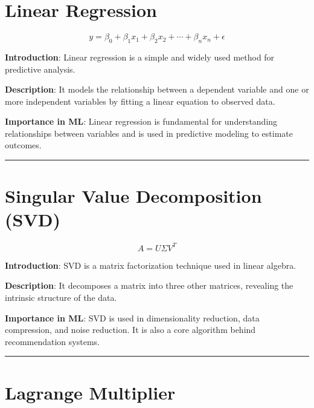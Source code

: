 \documentclass[
  12 pt,
  a4paper,
]{book}
\numberwithin{equation}{section}
\theoremstyle{plain}      %
\theoremstyle{definition} %
\theoremstyle{remark}     %
\theoremstyle{note}         %
\begin{document}
\hypertarget{linear-regression}{%
\chapter{Linear Regression}\label{linear-regression}}

\[
y = \beta_0 + \beta_1 x_1 + \beta_2 x_2 + \cdots + \beta_n x_n + \epsilon
\]

\textbf{Introduction}: Linear regression is a simple and widely used
method for predictive analysis.

\textbf{Description}: It models the relationship between a dependent
variable and one or more independent variables by fitting a linear
equation to observed data.

\textbf{Importance in ML}: Linear regression is fundamental for
understanding relationships between variables and is used in predictive
modeling to estimate outcomes.

\begin{center}\rule{0.5\linewidth}{0.5pt}\end{center}

\newpage

\hypertarget{singular-value-decomposition-svd}{%
\chapter{Singular Value Decomposition
(SVD)}\label{singular-value-decomposition-svd}}

\[
A = U \Sigma V^T
\]

\textbf{Introduction}: SVD is a matrix factorization technique used in
linear algebra.

\textbf{Description}: It decomposes a matrix into three other matrices,
revealing the intrinsic structure of the data.

\textbf{Importance in ML}: SVD is used in dimensionality reduction, data
compression, and noise reduction. It is also a core algorithm behind
recommendation systems.

\begin{center}\rule{0.5\linewidth}{0.5pt}\end{center}

\newpage

\hypertarget{lagrange-multiplier}{%
\chapter{Lagrange Multiplier}\label{lagrange-multiplier}}
\end{document}
